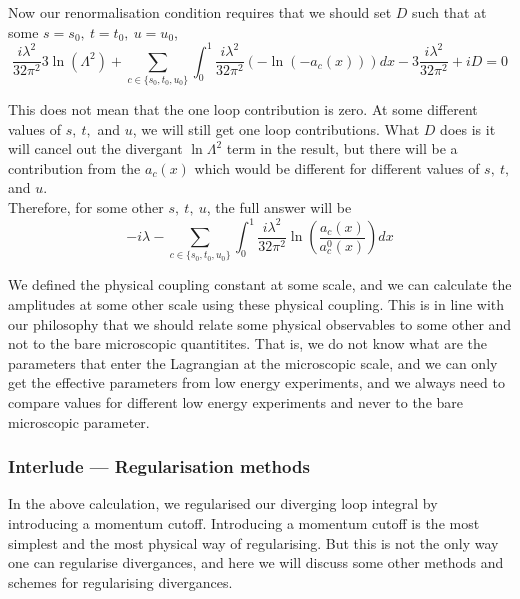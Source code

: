 \documentclass[11pt]{article}
\numberwithin{equation}{section}
\begin{document}
Now our renormalisation condition requires that we should set \(D\) such that at some \(s=s_0,~t=t_0,~u=u_0\), 
\begin{equation*}
    \frac{i\lambda^2 }{32\pi^2} 3\ln(\Lambda^2) +  \sum_{c\in\{s_0,t_0,u_0\}} \int_0^1  \frac{i\lambda^2 }{32\pi^2} \left( - \ln (-a_c(x)) \right)dx -  3\frac{i\lambda^2 }{32\pi^2} + iD = 0
\end{equation*}

This does not mean that the one loop contribution is zero. At some different values of \(s,~t,\) and \(u\), we will still get one loop contributions. What \(D\) does is it will cancel out the divergant \(\ln\Lambda^2\) term in the result, but there will be a contribution from the \(a_c(x)\) which would be different for different values of \(s,~t,\) and \(u\).\\

Therefore, for some other \(s,~t,~u\), the full answer will be 
\begin{equation*}
    -i\lambda - \sum_{c\in\{s_0,t_0,u_0\}} \int_0^1  \frac{i\lambda^2 }{32\pi^2}  \ln \left(\frac{a_c(x)}{a_c^0(x)} \right)dx
\end{equation*}

We defined the physical coupling constant at some scale, and we can calculate the amplitudes at some other scale using these physical coupling. This is in line with our philosophy that we should relate some physical observables to some other and not to the bare microscopic quantitites. That is, we do not know what are the parameters that enter the Lagrangian at the microscopic scale, and we can only get the effective parameters from low energy experiments, and we always need to compare values for different low energy experiments and never to the bare microscopic parameter.

\subsubsection{Interlude — Regularisation methods}
In the above calculation, we regularised our diverging loop integral by introducing a momentum cutoff. Introducing a momentum cutoff is the most simplest and the most physical way of regularising. But this is not the only way one can regularise divergances, and here we will discuss some other methods and schemes for regularising divergances. \\
\end{document}
